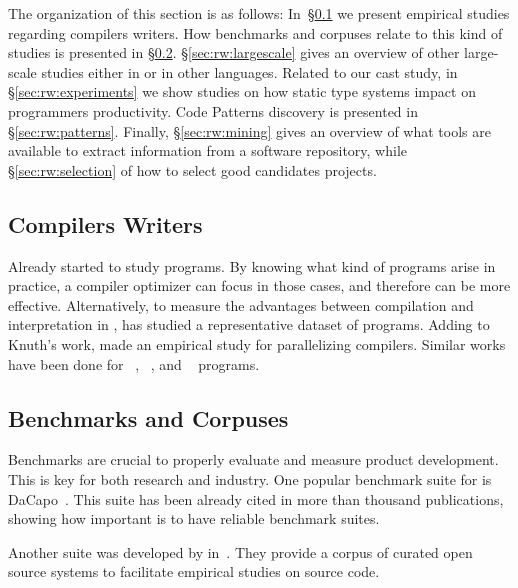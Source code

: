 The organization of this section is as follows: 
In~\S\ref{sec:rw:compilers} we present empirical studies regarding
compilers writers. 
How benchmarks and corpuses relate to this kind of studies is
presented in \S\ref{sec:rw:benchmarks}. 
\S\ref{sec:rw:largescale} gives an overview of other large-scale studies either in \java{} or in other languages. 
Related to our cast study, in \S\ref{sec:rw:experiments} we show studies on how static type systems impact on programmers productivity. 
Code Patterns discovery is presented in \S\ref{sec:rw:patterns}. 
Finally, \S\ref{sec:rw:mining} gives an overview of what tools are available to extract information from a software repository,
while \S\ref{sec:rw:selection} of how to select good candidates projects. 

\subsection{Compilers Writers} \label{sec:rw:compilers}

Already \cite{knuth_empirical_1971} started to study \fortran{} programs.
By knowing what kind of programs arise in practice, a compiler optimizer can focus in those cases, and therefore can be more effective.
Alternatively, to measure the advantages between compilation and interpretation in \basic{}, \cite{hammond_basic_1977} has studied a representative dataset of programs.
Adding to Knuth's work, \cite{shen_empirical_1990} made an empirical study for parallelizing compilers.
Similar works have been done for \cobol{}~\cite{salvadori_static_1975,chevance_static_1978}, \pascal{}~\cite{cook_contextual_1982}, and \apl{}~\cite{saal_properties_1975,saal_empirical_1977} programs. 

\subsection{Benchmarks and Corpuses} \label{sec:rw:benchmarks}

Benchmarks are crucial to properly evaluate and measure product development.
This is key for both research and industry.
One popular benchmark suite for \java{} is DaCapo~\cite{blackburn_dacapo_2006}.
This suite has been already cited in more than thousand publications, showing how important is to have reliable benchmark suites.

Another suite was developed by in~\cite{tempero_qualitas_2010}.
They provide a corpus of curated open source systems to facilitate empirical studies on source code.

